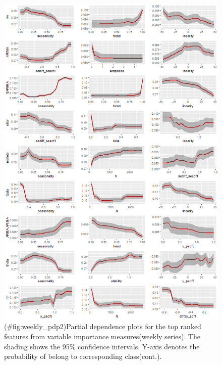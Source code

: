 \documentclass[11pt,a4paper,]{article}
\theoremstyle{definition}
\theoremstyle{definition}
\theoremstyle{definition}
\theoremstyle{remark}
\begin{document}
\begin{figure}
\centering
\includegraphics{figures/weekly_pdp2-1.png}
\caption{(\#fig:weekly\_pdp2)Partial dependence plots for the top ranked
features from variable importance measures(weekly series). The shading
shows the 95\% confidence intervals. Y-axis denotes the probability of
belong to corresponding class(cont.).}
\end{figure}

\newpage
\end{document}
